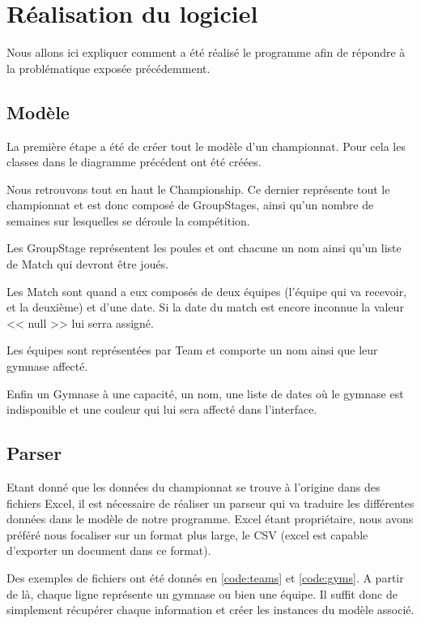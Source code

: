 \documentclass[final, noposter]{polytech/polytech}
\begin{document}
	
\chapter{Réalisation du logiciel}
	Nous allons ici expliquer comment a été réalisé le programme afin de répondre à la problématique exposée précédemment.
	
	\section{Modèle}
		
		La première étape a été de créer tout le modèle d'un championnat.
		Pour cela les classes dans le diagramme précédent ont été créées.
		
		Nous retrouvons tout en haut le Championship.
		Ce dernier représente tout le championnat et est donc composé de GroupStages, ainsi qu'un nombre de semaines sur lesquelles se déroule la compétition.
		
		Les GroupStage représentent les poules et ont chacune un nom ainsi qu'un liste de Match qui devront être joués.
		
		Les Match sont quand a eux composés de deux équipes (l'équipe qui va recevoir, et la deuxième) et d'une date.
		Si la date du match est encore inconnue la valeur << null >> lui serra assigné.
		
		Les équipes sont représentées par Team et comporte un nom ainsi que leur gymnase affecté.

		Enfin un Gymnase à une capacité, un nom, une liste de dates où le gymnase est indisponible et une couleur qui lui sera affecté dans l'interface.

	\section{Parser}
		Etant donné que les données du championnat se trouve à l'origine dans des fichiers Excel, il est nécessaire de réaliser un parseur qui va traduire les différentes données dans le modèle de notre programme.
		Excel étant propriétaire, nous avons préféré nous focaliser sur un format plus large, le CSV (excel est capable d'exporter un document dans ce format).
		
		Des exemples de fichiers ont été donnés en \autoref{code:teams} et \autoref{code:gyms}.
		A partir de là, chaque ligne représente un gymnase ou bien une équipe.
		Il suffit donc de simplement récupérer chaque information et créer les instances du modèle associé.
		
\end{document}
